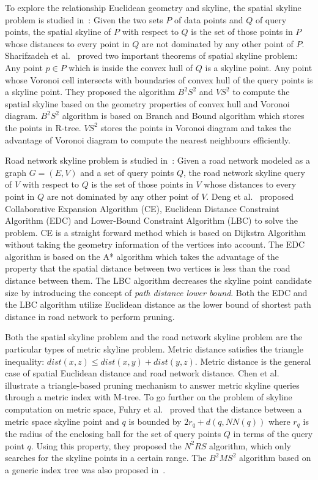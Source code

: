 To explore the relationship Euclidean geometry and skyline, the spatial skyline problem is studied in~\cite{sharifzadeh2006spatial}: Given the two sets $P$ of data points and $Q$ of query points, the spatial skyline of $P$ with respect to $Q$ is the set of those points in $P$ whose distances to every point in $Q$ are not dominated by any other point of $P$. Sharifzadeh et al.~\cite{sharifzadeh2006spatial} proved two important theorems of spatial skyline problem: Any point $p \in P$ which is inside the convex hull of $Q$ is a skyline point. Any point whose Voronoi cell intersects with boundaries of convex hull of the query points is a skyline point. They proposed the algorithm $B^2S^2$ and $VS^2$ to compute the spatial skyline based on the geometry properties of convex hull and Voronoi diagram. $B^2S^2$ algorithm is based on Branch and Bound algorithm which stores the points in R-tree. $VS^2$ stores the points in Voronoi diagram and takes the advantage of Voronoi diagram to compute the nearest neighbours efficiently.

Road network skyline problem is studied in~\cite{deng2007multi}: Given a road network modeled as a graph $G=(E, V)$ and a set of query points $Q$, the road network skyline query of $V$ with respect to $Q$ is the set of those points in $V$ whose distances to every point in $Q$ are not dominated by any other point of $V$. Deng et al.~\cite{deng2007multi} proposed Collaborative Expansion Algorithm (CE), Euclidean Distance Constraint Algorithm (EDC) and Lower-Bound Constraint Algorithm (LBC) to solve the problem. CE is a straight forward method which is based on Dijkstra Algorithm without taking the geometry information of the vertices into account. The EDC algorithm is based on the A* algorithm which takes the advantage of the property that the spatial distance between two vertices is less than the road distance between them. The LBC algorithm decreases the skyline point candidate size by introducing the concept of \emph{path distance lower bound}. Both the EDC and the LBC algorithm utilize Euclidean distance as the lower bound of shortest path distance in road network to perform pruning. 

Both the spatial skyline problem and the road network skyline problem are the particular types of metric skyline problem. Metric distance satisfies the triangle inequality: $dist(x, z) \leq dist(x, y) + dist(y, z)$. Metric distance is the general case of spatial Euclidean distance and road network distance. Chen et al.~\cite{chen2008dynamic} illustrate a triangle-based pruning mechanism to answer metric skyline queries through a metric index with M-tree. To go further on the problem of skyline computation on metric space, Fuhry et al.~\cite{fuhry2009efficient} proved that the distance between a metric space skyline point and $q$ is bounded by $2r_q + d(q, NN(q))$ where $r_q$ is the radius of the enclosing ball for the set of query points $Q$ in terms of the query point $q$. Using this property, they proposed the $N^2RS$ algorithm, which only searches for the skyline points in a certain range. The $B^2MS^2$ algorithm based on a generic index tree was also proposed in~\cite{fuhry2009efficient}.

